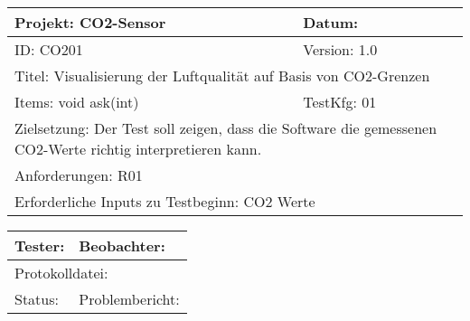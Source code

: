 \label{Testing}

\begin{table}[!hbt]
	
	\centering
	
	\begin{tabular}{|p{5cm}|p{5cm}|}
		
		\hline
		Projekt: CO2-Sensor & Datum: \\
		\hline
		ID: CO201 & Version: 1.0 \\
		\hline
		\multicolumn{2}{|l|}{Titel: Visualisierung der Luftqualität auf Basis von CO2-Grenzen} \\
		\hline
		Items: void ask(int) & TestKfg: 01 \\
		\hline
		\multicolumn{2}{|p{\textwidth-2\tabcolsep}|}{Zielsetzung: Der Test soll zeigen, dass die Software die gemessenen CO2-Werte richtig interpretieren kann.} \\
		\hline
		\multicolumn{2}{|l|}{Anforderungen: R01} \\
		\hline
		\multicolumn{2}{|l|}{Erforderliche Inputs zu Testbeginn: CO2 Werte} \\
		\hline
			
	\end{tabular}

\label{tab:Test_1}

\end{table}

\begin{table}[!hbt]
	
	\centering
	
	\begin{tabular}{|p{7.4cm}|p{7.4cm}|}
	
		\hline
		Tester: & Beobachter: \\
		\hline
		\multicolumn{2}{|l|}{Protokolldatei: } \\
		\hline
		Status: & Problembericht: \\
		\hline
	
	\end{tabular}

	\label{tab:Tester1}

\end{table}


